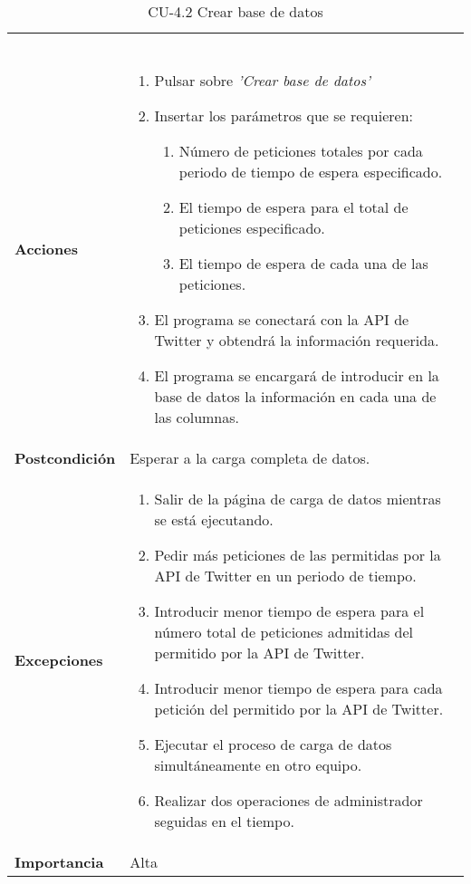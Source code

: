\begin{table}[h!]
\begin{tabularx}{\linewidth}{ p{} p{} }
\begin{enumerate}
		\end{enumerate}\\
		\textbf{Acciones}             &
		\begin{enumerate}
			\def\labelenumi{\arabic{enumi}.}
			\tightlist
			\item Pulsar sobre \textit{'Crear base de datos'}
            \item Insertar los parámetros que se requieren:            
            \begin{enumerate}
    			\def\labelenumi{\arabic{enumi}.}
    			\tightlist
    			\item Número de peticiones totales por cada periodo de tiempo de espera especificado.
                \item El tiempo de espera para el total de peticiones especificado.
                \item El tiempo de espera de cada una de las peticiones.
		  \end{enumerate}
            \item El programa se conectará con la API de Twitter y obtendrá la información requerida.
            \item El programa se encargará de introducir en la base de datos la información en cada una de las columnas.
		\end{enumerate}\\
		\textbf{Postcondición}     &   Esperar a la carga completa de datos.\\
		\textbf{Excepciones}          & 
        \begin{enumerate}
            \def\labelenumi{\arabic{enumi}.}
            \tightlist
            \item Salir de la página de carga de datos mientras se está ejecutando.
            \item Pedir más peticiones de las permitidas por la API de Twitter en un periodo de tiempo.
            \item Introducir menor tiempo de espera para el número total de peticiones admitidas del permitido por la API de Twitter.
            \item Introducir menor tiempo de espera para cada petición del permitido por la API de Twitter.
            \item Ejecutar el proceso de carga de datos simultáneamente en otro equipo.
            \item Realizar dos operaciones de administrador seguidas en el tiempo.
		\end{enumerate}\\
		\textbf{Importancia}          & Alta \\
		\bottomrule
	\end{tabularx}
	\caption{CU-4.2 Crear base de datos}
\end{table}

